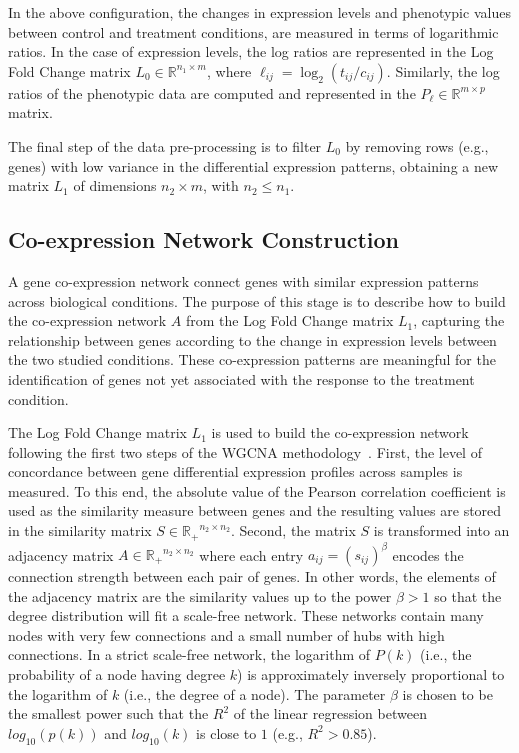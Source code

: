 \documentclass{bmcart}
\begin{document}
In the above configuration, the changes in expression levels and
phenotypic values between control and treatment conditions, are
measured in terms of logarithmic ratios. In the case of expression
levels, the log ratios are represented in the Log Fold Change matrix
$L_0 \in \mathbb{R}^{n_1 \times m}$, where $\ell_{ij}=\log_2
(t_{ij}/c_{ij})$. Similarly, the log ratios of the phenotypic data are
computed and represented in the $P_\ell \in \mathbb{R}^{m \times p}$
matrix.
\vspace{0.5cm}

The final step of the data pre-processing is to filter $L_0$ by
removing rows (e.g., genes) with low variance in the differential
expression patterns, obtaining a new matrix $L_1$ of dimensions $n_2
\times m$, with $n_2 \leq n_1$.

\subsection*{Co-expression Network Construction}

A gene co-expression network connect genes with similar expression
patterns across biological conditions. The purpose of this stage is to
describe how to build the co-expression network $A$ from the Log Fold
Change matrix $L_1$, capturing the relationship between genes
according to the change in expression levels between the two studied
conditions. These co-expression patterns are meaningful for the
identification of genes not yet associated with the response to the
treatment condition.
\vspace{0.5cm}

The Log Fold Change matrix $L_1$ is used to build the co-expression
network following the first two steps of the WGCNA
methodology~\cite{langfelder2008wgcna}. First, the level of
concordance between gene differential expression profiles across
samples is measured. To this end, the absolute value of the Pearson
correlation coefficient is used as the similarity measure between
genes and the resulting values are stored in the similarity matrix
$S\in \mathbb{R_{+}}^{n_2 \times n_2}$. Second, the matrix $S$ is
transformed into an adjacency matrix $A \in \mathbb{R_+}^{n_2\times
  n_2}$ where each entry $a_{ij} = (s_{ij})^\beta $ encodes the
connection strength between each pair of genes. In other words, the
elements of the adjacency matrix are the similarity values up to the
power $\beta > 1$ so that the degree distribution will fit a
scale-free network. These networks contain many nodes with very few
connections and a small number of hubs with high connections. In a
strict scale-free network, the logarithm of $P(k)$ (i.e., the
probability of a node having degree $k$) is approximately inversely
proportional to the logarithm of $k$ (i.e., the degree of a node).
The parameter $\beta$ is chosen to be the smallest power such that the
$R^2$ of the linear regression between $log_{10}(p(k))$ and
$log_{10}(k)$ is close to $1$ (e.g., $R^2 > 0.85$).
\end{document}
